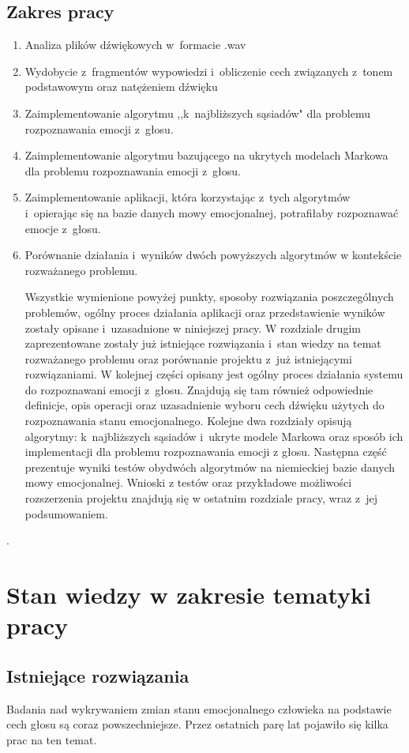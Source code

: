 \documentclass[declaration,shortabstract]{iithesis}
\begin{document}
\section{Zakres pracy}
\begin{enumerate}
\item Analiza plików dźwiękowych w~formacie .wav
\item Wydobycie z~fragmentów wypowiedzi i~obliczenie cech związanych z~tonem podstawowym oraz natężeniem dźwięku
\item Zaimplementowanie algorytmu ,,k~najbliższych sąsiadów" dla problemu rozpoznawania emocji z~głosu.
\item Zaimplementowanie algorytmu bazującego na ukrytych modelach Markowa dla problemu rozpoznawania emocji z~głosu.
\item Zaimplementowanie aplikacji, która korzystając z~tych algorytmów i~opierając się na bazie danych mowy emocjonalnej, potrafiłaby rozpoznawać emocje z~głosu.
\item Porównanie działania i~wyników dwóch powyższych algorytmów w kontekście rozważanego problemu.

Wszystkie wymienione powyżej punkty, sposoby rozwiązania poszczególnych problemów, ogólny proces działania aplikacji oraz przedstawienie wyników zostały opisane i~uzasadnione w niniejszej pracy. W rozdziale drugim zaprezentowane zostały już istniejące rozwiązania i~stan wiedzy na temat rozważanego problemu oraz porównanie projektu z~już istniejącymi rozwiązaniami. W kolejnej części opisany jest ogólny proces działania systemu do rozpoznawani emocji z~głosu. Znajdują się tam również odpowiednie definicje, opis operacji oraz uzasadnienie wyboru cech dźwięku użytych do rozpoznawania stanu emocjonalnego. Kolejne dwa rozdziały opisują algorytmy: k~najbliższych sąsiadów i~ukryte modele Markowa oraz sposób ich implementacji dla problemu rozpoznawania emocji z głosu. Następna część prezentuje wyniki testów obydwóch algorytmów na niemieckiej bazie danych mowy emocjonalnej. Wnioski z testów oraz przykładowe możliwości rozszerzenia projektu znajdują się w ostatnim rozdziale pracy, wraz z~jej podsumowaniem.

\end{enumerate}.

\chapter{Stan wiedzy w zakresie tematyki pracy}
\section{Istniejące rozwiązania}
Badania nad wykrywaniem zmian stanu emocjonalnego człowieka na podstawie cech głosu są coraz powszechniejsze. Przez ostatnich parę lat pojawiło się kilka prac na ten temat. 
\end{document}

